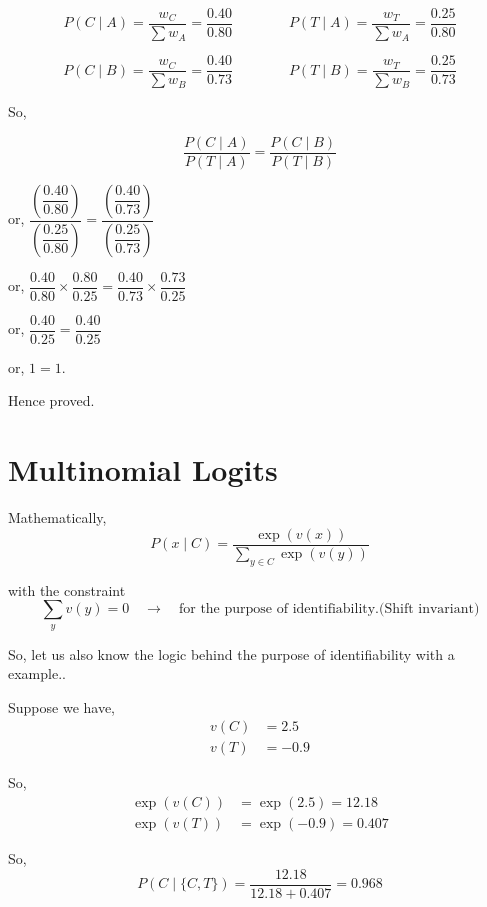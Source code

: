 \[
P(C \mid A) = \frac{w_C}{\sum w_A} = \frac{0.40}{0.80}
\qquad\qquad
P(T \mid A) = \frac{w_T}{\sum w_A} = \frac{0.25}{0.80}
\]

\[
P(C \mid B) = \frac{w_C}{\sum w_B} = \frac{0.40}{0.73}
\qquad\qquad
P(T \mid B) = \frac{w_T}{\sum w_B} = \frac{0.25}{0.73}
\]

So,

\begin{equation*}
    \frac{P(C \mid A)}{P(T \mid A)} = \frac{P(C \mid B)}{P(T \mid B)}
\end{equation*}

or, \quad
$\dfrac{\left(\dfrac{0.40}{0.80}\right)}{\left(\dfrac{0.25}{0.80}\right)}
= \dfrac{\left(\dfrac{0.40}{0.73}\right)}{\left(\dfrac{0.25}{0.73}\right)}$

or, \quad
$\dfrac{0.40}{0.80} \times \dfrac{0.80}{0.25}
= \dfrac{0.40}{0.73} \times \dfrac{0.73}{0.25}$

or, \quad $\dfrac{0.40}{0.25} = \dfrac{0.40}{0.25}$

or, \quad $1 = 1$.

Hence proved.

\section{Multinomial Logits}

Mathematically,
\begin{equation*}
    P(x \mid C) = \frac{\exp(v(x))}{\displaystyle\sum_{y \in C} \exp(v(y))}
\end{equation*}

with the constraint
\begin{equation*}
    \sum_{y} v(y) = 0 \quad \rightarrow \quad \text{for the purpose of identifiability.(Shift invariant)}
\end{equation*}

So, let us also know the logic behind the purpose of identifiability with a example..

Suppose we have,
\begin{align*}
    v(C) &= 2.5 \\
    v(T) &= -0.9
\end{align*}

So,
\begin{align*}
    \exp(v(C)) &= \exp(2.5) = 12.18 \\
    \exp(v(T)) &= \exp(-0.9) = 0.407
\end{align*}

So,
\begin{equation*}
    P(C \mid \{C,T\}) = \frac{12.18}{12.18 + 0.407} = 0.968
\end{equation*}

